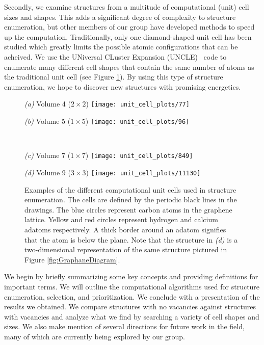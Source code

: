 \documentclass[oneside, noacknowlegments]{BYUPhys}
\begin{document}
Secondly, we examine structures from a multitude of computational 
(unit) cell sizes and shapes. This adds a significant degree of 
complexity to structure enumeration, but other members of our group 
have developed methods to speed up the computation. Traditionally, 
only one diamond-shaped unit cell has been studied which greatly 
limits the possible atomic configurations that can be acheived.  We 
use the UNiversal CLuster Expansion (UNCLE)~\cite{LerchUNCLE} code 
to enumerate many different cell shapes that contain the same 
number of atoms as the traditional unit cell (see Figure 
\ref{fig:unit_cells}).  By using this type of structure 
enumeration, we hope to discover new structures with promising 
energetics.

\begin{figure}
	\centering
	\begin{minipage}{0.475\textwidth}
		\centering \textit{(a)} Volume 4 ($2\times2$)
		\texttt{[image: unit\_cell\_plots/77]}
	\end{minipage}
	\hfill
	\begin{minipage}{0.475\textwidth}
		\centering \textit{(b)} Volume 5 ($1\times5$)
		\texttt{[image: unit\_cell\_plots/96]}
	\end{minipage}
	\\ \bigskip
	\begin{minipage}{0.475\textwidth}
		\centering \textit{(c)} Volume 7 ($1\times7$)
		\texttt{[image: unit\_cell\_plots/849]}
	\end{minipage}
	\hfill
	\begin{minipage}{0.475\textwidth}
		\centering \textit{(d)} Volume 9 ($3\times3$)
		\texttt{[image: unit\_cell\_plots/11130]}	\\
	\end{minipage}
	\raggedright
	\caption{Examples of the different computational unit cells 
		used in structure enumeration. The cells are defined by 
		the periodic black lines in the drawings. The blue circles 
		represent carbon atoms in the graphene lattice. Yellow and 
		red circles represent hydrogen and calcium adatoms 
		respectively. A thick border around an adatom signifies 
		that the atom is below the plane. Note that the structure 
		in \textit{(d)} is a two-dimensional representation of the 
		same structure pictured in Figure 
		\ref{fig:GraphaneDiagram}.}
	\label{fig:unit_cells}
\end{figure}

We begin by briefly summarizing some key concepts and providing 
definitions for important terms. We will outline the computational 
algorithms used for structure enumeration, selection, and 
prioritization. We conclude with a presentation of the results we
obtained. We compare structures with no vacancies against 
structures with vacancies and analyze what we find by searching a 
variety of cell shapes and sizes. We also make mention of several 
directions for future work in the field, many of which are 
currently being explored by our group. 
\end{document}
